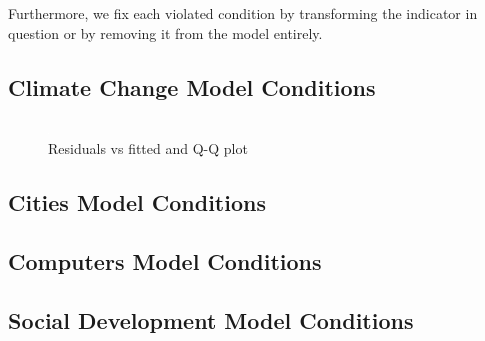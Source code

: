 \documentclass[12pt, twocolumn]{article}
\begin{document}
Furthermore, we fix each violated condition by transforming the indicator in question or by removing it from the model entirely.

\subsection{Climate Change Model Conditions}


\begin{figure}[h!]
  \centering
  \includegraphics[width=\textwidth]{images/climate_model_conditions}
  \caption{\label{climate_model_conditions}Residuals vs fitted and Q-Q plot}
\end{figure}

\subsection{Cities Model Conditions}
\subsection{Computers Model Conditions}
\subsection{Social Development Model Conditions}
\end{document}

